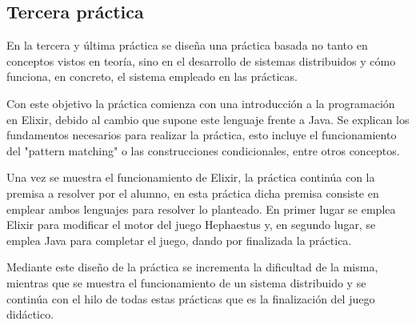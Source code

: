 \subsection{Tercera práctica}

En la tercera y última práctica se diseña una práctica basada no tanto en conceptos vistos en teoría, sino en el desarrollo de sistemas distribuidos y cómo funciona, en concreto, el sistema empleado en las prácticas. 

Con este objetivo la práctica comienza con una introducción a la programación en Elixir, debido al cambio que supone este lenguaje frente a Java. Se explican los fundamentos necesarios para realizar la práctica, esto incluye el funcionamiento del "pattern matching" o las construcciones condicionales, entre otros conceptos.

Una vez se muestra el funcionamiento de Elixir, la práctica continúa con la premisa a resolver por el alumno, en esta práctica dicha premisa consiste en emplear ambos lenguajes para resolver lo planteado. En primer lugar se emplea Elixir para modificar el motor del juego Hephaestus y, en segundo lugar, se emplea Java para completar el juego, dando por finalizada la práctica. 

Mediante este diseño de la práctica se incrementa la dificultad de la misma, mientras que se muestra el funcionamiento de un sistema distribuido y se continúa con el hilo de todas estas prácticas que es la finalización del juego didáctico.